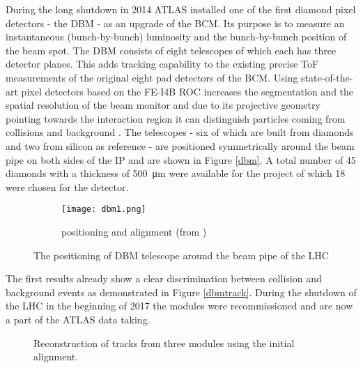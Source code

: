 During the long shutdown in 2014 ATLAS installed one of the first diamond pixel detectors - the \ac{DBM} - as an upgrade of the \ac{BCM}. Its purpose is to measure an instantaneous (bunch-by-bunch) luminosity and the bunch-by-bunch position of the beam spot. The \ac{DBM} consists of eight telescopes of which each has three detector planes. This adds tracking capability to the existing precise \ac{ToF} measurements of the original eight pad detectors of the \ac{BCM}. Using state-of-the-art pixel detectors based on the FE-I4B \ac{ROC} \cite{malte} increases the segmentation and the spatial resolution of the beam monitor and due to its projective geometry pointing towards the interaction region it can distinguish particles coming from collisions and background \cite{dbm}. The telescopes - six of which are built from \pcvd diamonds and two from silicon as reference - are positioned symmetrically around the beam pipe on both sides of the \ac{IP} and are shown in Figure \vref{dbm}. A total number of 45 diamonds with a thickness of \SI{500}{\micro\meter} were available for the project of which 18 were chosen for the detector.

\begin{figure}
	\centering
	\begin{subfigure}{.66\textwidth}
		\centering
		\vspace*{.05\textheight}
		\texttt{[image: dbm1.png]}
		\vspace*{.02\textheight}
		\caption{positioning and alignment (from \cite{dbm})}
	\end{subfigure}
	\caption{The positioning of \ac{DBM} telescope around the beam pipe of the \ac{LHC}}
	\label{dbm}
\end{figure}

\noindent
The first results already show a clear discrimination between collision and background events as demonstrated in Figure \vref{dbmtrack}. During the shutdown of the \ac{LHC} in the beginning of 2017 the modules were recommissioned and are now a part of the ATLAS data taking.

\begin{figure}
	\centering
	\caption{Reconstruction of tracks from three modules using the initial alignment.}
	\label{dbmtrack}
\end{figure}

